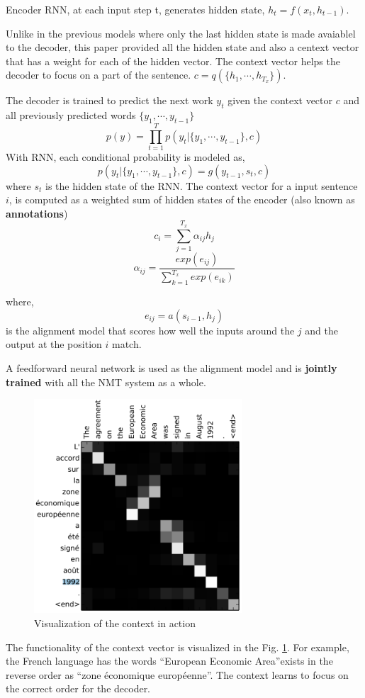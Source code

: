 \documentclass[conference]{IEEEtran}
\begin{document}
Encoder RNN, at each input step t, generates hidden state, $h_t = f(x_t, h_{t-1})$.

Unlike in the previous models where only the last hidden state is made avaiablel to the decoder, this paper provided all the hidden state and also a centext vector that has a weight for each of the hidden vector. The context vector helps the decoder to focus on a part of the sentence. $c = q(\{h_1,\cdots,h_{T_x}\})$. 

The decoder is trained to predict the next work $y_t$ given the context vector $c$ and all previously predicted words $\{ y_1, \cdots, y_{t-1}\}$
 $$ p(y) = \prod^{T}_{t=1} p(y_t | \{ y_1, \cdots, y_{t-1}\} ,c ) $$
 With RNN, each conditional probability is modeled as,
 $$ p(y_t | \{ y_1, \cdots, y_{t-1}\}, c) = g(y_{t-1}, s_t, c) $$ where $s_t$ is the hidden state of the RNN.
 The context vector for a input sentence $i$, is computed as a weighted sum of hidden states of the encoder (also known as \textbf{annotations})
  $$ c_i = \sum_{j=1}^{T_{x}} \alpha_{ij} h_j$$
  $$ \alpha_{ij} = \frac{ exp(e_{ij})}{ \sum_{k=1}^{T_x} exp (e_{ik})}$$

where,
$$ e_{ij} = a(s_{i-1}, h_j)  $$ is the alignment model that scores how well the inputs around the $j$ and the output at the position $i$ match.

A feedforward neural network is used as the alignment model and is \textbf{jointly trained} with all the NMT system as a whole.

 \begin{figure}[h]
    \includegraphics[height=8cm]{img/contextres.png}  
    \caption{Visualization of the context in action}
    \label{fig:contextvis}
  \end{figure}
  

The functionality of the context vector is visualized in the Fig. \ref{fig:contextvis}. For example, the French language has the words  \textquotedblleft European Economic Area\textquotedblright exists in the reverse order as \textquotedblleft zone \'{e}conomique europ\'{e}enne\textquotedblright. The context learns to focus on the correct order for the decoder. 




\end{document}
